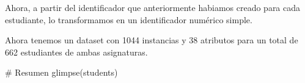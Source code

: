 \documentclass[]{article}
\newenvironment{Shaded}{\begin{snugshade}}{\end{snugshade}}
\newcommand{\CommentTok}[1]{\textcolor[rgb]{0.50,0.62,0.50}{#1}}
\newcommand{\DataTypeTok}[1]{\textcolor[rgb]{0.87,0.87,0.75}{#1}}
\newcommand{\KeywordTok}[1]{\textcolor[rgb]{0.94,0.87,0.69}{#1}}
\newcommand{\NormalTok}[1]{\textcolor[rgb]{0.80,0.80,0.80}{#1}}
\newcommand{\OperatorTok}[1]{\textcolor[rgb]{0.94,0.94,0.82}{#1}}
\newcommand{\StringTok}[1]{\textcolor[rgb]{0.80,0.58,0.58}{#1}}
\begin{document}
Ahora, a partir del identificador que anteriormente habiamos creado para
cada estudiante, lo transformamos en un identificador numérico simple.

\begin{Shaded}
\end{Shaded}

Ahora tenemos un dataset con 1044 instancias y 38 atributos para un
total de 662 estudiantes de ambas asignaturas.

\begin{Shaded}
\begin{Highlighting}[]
\CommentTok{# Resumen}
\KeywordTok{glimpse}\NormalTok{(students)}
\end{Highlighting}
\end{Shaded}
\end{document}
